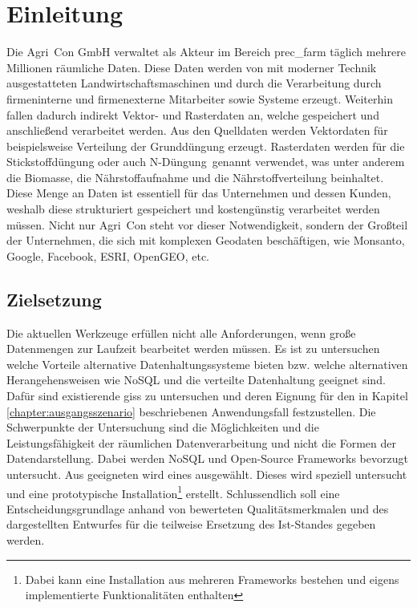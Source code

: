 \chapter{Einleitung}
Die Agri~Con GmbH verwaltet als Akteur im Bereich \Gls{prec_farm} täglich mehrere Millionen räumliche Daten. Diese Daten werden von mit moderner Technik ausgestatteten Landwirtschaftsmaschinen und durch die Verarbeitung durch firmeninterne und firmenexterne Mitarbeiter sowie Systeme erzeugt. Weiterhin fallen dadurch indirekt Vektor- und Rasterdaten an, welche gespeichert und anschließend verarbeitet werden.
Aus den Quelldaten werden Vektordaten für beispielsweise Verteilung der Grunddüngung erzeugt. Rasterdaten werden für die Stickstoffdüngung oder auch \glqq N-Düngung\grqq\ genannt verwendet, was unter anderem die Biomasse, die Nährstoffaufnahme und die Nährstoffverteilung beinhaltet.
Diese Menge an Daten ist essentiell für das Unternehmen und dessen Kunden, weshalb diese strukturiert gespeichert und kostengünstig verarbeitet werden müssen. Nicht nur Agri~Con steht vor dieser Notwendigkeit, sondern der Großteil der Unternehmen, die sich mit komplexen Geodaten beschäftigen, wie Monsanto, Google, Facebook, ESRI, OpenGEO, etc.



\section{Zielsetzung}
Die aktuellen Werkzeuge erfüllen nicht alle Anforderungen, wenn große Datenmengen zur Laufzeit bearbeitet werden müssen. %
Es ist zu untersuchen welche Vorteile alternative Datenhaltungssysteme bieten bzw. welche alternativen Herangehensweisen wie NoSQL und die verteilte Datenhaltung geeignet sind.
Dafür sind existierende \Glspl{gis} zu untersuchen und deren Eignung für den in Kapitel \ref{chapter:ausgangsszenario} beschriebenen Anwendungsfall festzustellen. Die Schwerpunkte der Untersuchung sind die Möglichkeiten und die Leistungsfähigkeit der räumlichen Datenverarbeitung und nicht die Formen der Datendarstellung.
Dabei werden NoSQL und Open-Source Frameworks bevorzugt untersucht.
Aus geeigneten wird eines ausgewählt. Dieses wird speziell untersucht und eine prototypische Installation\footnote{Dabei kann eine Installation aus mehreren Frameworks bestehen und eigens implementierte Funktionalitäten enthalten} erstellt.
Schlussendlich soll eine Entscheidungsgrundlage anhand von bewerteten Qualitätsmerkmalen und des dargestellten Entwurfes für die teilweise Ersetzung des Ist-Standes gegeben werden.

